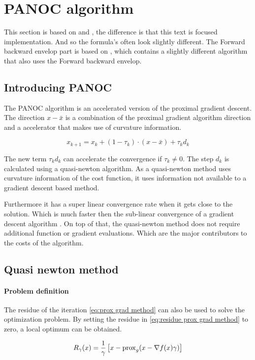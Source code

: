 \chapter{PANOC algorithm}
	This section is based on \cite{LorenzoStella2017} and \cite{AjaySathya2017}, the difference is that this text is focused implementation. And so the formula's often look slightly different. The Forward backward envelop part is based on \cite{Themelis}, which contains a slightly different algorithm that also uses the Forward backward envelop.
	\section{Introducing PANOC}
		The PANOC algorithm is an accelerated version of the proximal gradient descent. The direction  $x-\bar{x}$ is a combination of the proximal gradient algorithm direction and a accelerator that makes use of curvature information.
		
		\begin{equation}
		x_{k+1} = x_k + (1-\tau_k)\cdot (x-\bar{x}) + \tau_k d_k
		\end{equation}
		
		The new term $\tau_kd_k$ can accelerate the convergence if $\tau_k\neq0$. The step $d_k$ is calculated using a quasi-newton algorithm. As a quasi-newton method uses curvature information of the cost function, it uses information not available to a gradient descent based method. 
		
		Furthermore it has a super linear convergence rate when it gets close to the solution. Which is much faster then the sub-linear convergence of a gradient descent algorithm . On top of that, the quasi-newton method does not require additional function or gradient evaluations. Which are the major contributors to the costs of the algorithm.
		
	\section{Quasi newton method}
		\subsubsection{Problem definition}
			The residue of the iteration \eqref{eq:prox grad method} can also be used to solve the optimization problem.  By setting the residue in \eqref{eq:residue prox grad method} to zero, a local optimum can be obtained.
			
			\begin{equation}
			R_{\gamma}(x)= \frac{1}{\gamma}\left[ x - \operatorname{prox}_g( x - \nabla f(x)\gamma) \right]
			\label{eq:residue prox grad method}
			\end{equation}
			
